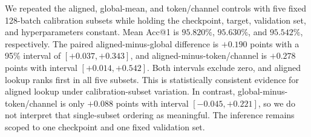 \begin{table}[H]
\centering
\footnotesize
{}
\caption{Semantic controls for QKFormer stage1 current replacement. Values are
full-validation Acc@1 (\%). Each setting holds the checkpoint, calibration
budget, target, validation split, and LUT size fixed while changing only the
address/control construction.}
\label{tab:current_replacement_controls}
\end{table}

We repeated the aligned, global-mean, and token/channel controls with five
fixed 128-batch calibration subsets while holding the checkpoint, target,
validation set, and hyperparameters constant. Mean Acc@1 is $95.820\%$,
$95.630\%$, and $95.542\%$, respectively. The paired aligned-minus-global
difference is $+0.190$ points with a 95\% interval of
$[+0.037,+0.343]$, and aligned-minus-token/channel is $+0.278$ points
with interval $[+0.014,+0.542]$. Both intervals exclude zero, and aligned
lookup ranks first in all five subsets. This is statistically consistent
evidence for aligned lookup under calibration-subset variation. In contrast,
global-minus-token/channel is only $+0.088$ points with interval
$[-0.045,+0.221]$, so we do not interpret that single-subset ordering as
meaningful. The inference remains scoped to one checkpoint and one fixed
validation set.

